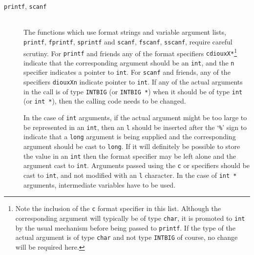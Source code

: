 \documentclass[twoside,11pt]{article}
\renewcommand{\_}{\texttt{\symbol{95}}}
\newcommand{\cc}[1]{{\tt #1}}
\newcommand{\ditem}[1]{\item[#1]\mbox{}\\}
\begin{document}
\begin{description}
\begin{description}
%
\ditem{\cc{printf}, \cc{scanf}}
The functions which use format strings and variable argument lists,
\cc{printf}, \cc{fprintf}, \cc{sprintf} and
\cc{scanf}, \cc{fscanf}, \cc{sscanf},
require careful scrutiny.
For \cc{printf} and friends
any of the format specifiers \cc{cdiouxX*}\footnote{
   Note the inclusion of the \cc{c} format specifier in this list.
   Although the corresponding argument will typically be of type \cc{char},
   it is promoted to \cc{int} by the usual mechanism before being
   passed to \cc{printf}.  If the type of the actual argument is
   of type \cc{char} and not type \cc{INT\_BIG} of course, no change
   will be required here.
}
indicate that the corresponding argument should be an \cc{int},
and the \cc{n} specifier indicates a pointer to \cc{int}.
For \cc{scanf} and friends, any of the specifiers \cc{diouxXn} indicate
pointer to \cc{int}.
If any of the actual arguments in the call is of type \cc{INT\_BIG}
(or \cc{INT\_BIG~*}) when it should be of type \cc{int} (or \cc{int~*}),
then the calling code needs to be changed.

In the case of \cc{int} arguments, if the actual argument
might be too large to be
represented in an \cc{int}, then an \cc{l} should be inserted
after the `{\tt\%}' sign to
indicate that a \cc{long} argument is being supplied and the
corresponding argument should be cast to \cc{long}.  If it will definitely
be possible to store the value in an \cc{int} then the format specifier
may be left alone and the argument cast to \cc{int}.
Arguments passed using the \cc{c} or \cc{*} specifiers should be cast
to \cc{int}, and not modified with an \cc{l} character.
In the case of \cc{int~*} arguments, intermediate variables have to be used.


\end{description}
\end{description}
\end{document}

